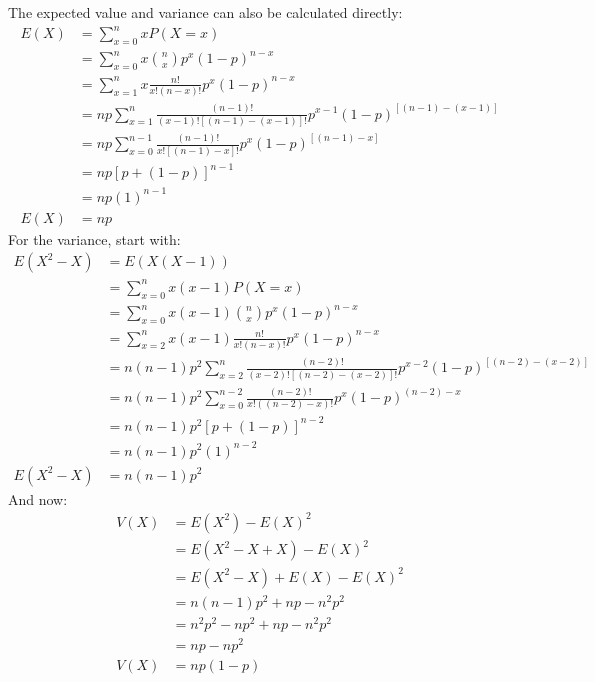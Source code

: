 \documentclass[letterpaper,12pt,fleqn]{article}
\begin{document}
The expected value and variance can also be calculated directly:
\begin{align*}
  E(X) &= \sum_{x=0}^nxP(X=x) \\
  &= \sum_{x=0}^nx\binom{n}{x}p^x(1-p)^{n-x} \\
  &= \sum_{x=1}^nx\frac{n!}{x!(n-x)!}p^x(1-p)^{n-x} \\
  &= np\sum_{x=1}^n\frac{(n-1)!}{(x-1)![(n-1)-(x-1)]!}p^{x-1}(1-p)^{[(n-1)-(x-1)]} \\
  &= np\sum_{x=0}^{n-1}\frac{(n-1)!}{x![(n-1)-x]!}p^x(1-p)^{[(n-1)-x]} \\
  &= np[p+(1-p)]^{n-1} \\
  &= np(1)^{n-1} \\
  E(X) &= np
\end{align*}
For the variance, start with:
\begin{align*}
  E(X^2-X) &= E(X(X-1)) \\
  &= \sum_{x=0}^nx(x-1)P(X=x) \\
  &= \sum_{x=0}^nx(x-1)\binom{n}{x}p^x(1-p)^{n-x} \\
  &= \sum_{x=2}^nx(x-1)\frac{n!}{x!(n-x)!}p^x(1-p)^{n-x} \\
  &= n(n-1)p^2\sum_{x=2}^n\frac{(n-2)!}{(x-2)![(n-2)-(x-2)]!}p^{x-2}(1-p)^{[(n-2)-(x-2)]} \\
  &= n(n-1)p^2\sum_{x=0}^{n-2}\frac{(n-2)!}{x!((n-2)-x)!}p^x(1-p)^{(n-2)-x} \\
  &= n(n-1)p^2[p+(1-p)]^{n-2} \\
  &= n(n-1)p^2(1)^{n-2} \\
  E(X^2-X) &= n(n-1)p^2
\end{align*}
And now:
\begin{align*}
  V(X) &= E(X^2)-E(X)^2 \\
  &= E(X^2-X+X)-E(X)^2 \\
  &= E(X^2-X)+E(X)-E(X)^2 \\
  &= n(n-1)p^2+np-n^2p^2 \\
  &= n^2p^2-np^2+np-n^2p^2 \\
  &= np-np^2 \\
  V(X) &= np(1-p)
\end{align*}
\end{document}

